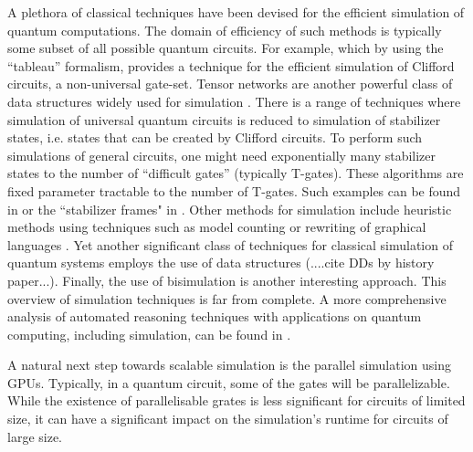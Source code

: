 \documentclass[runningheads]{llncs}
\begin{document}
A plethora of classical techniques have been devised for the efficient simulation of quantum computations. The domain of efficiency of such methods is typically some subset of all possible quantum circuits. For example, \cite{gottesman1997stabilizer} which by using the ``tableau'' formalism, provides a technique for the efficient simulation of Clifford circuits, a non-universal gate-set. Tensor networks are another powerful class of data structures widely used for simulation \cite{TN1,TN2}. There is a range of techniques where simulation of universal quantum circuits is reduced to simulation of stabilizer states, i.e. states that can be created by Clifford circuits. To perform such simulations of general circuits, one might need exponentially many stabilizer states to the number of ``difficult gates'' (typically T-gates). These algorithms are fixed parameter tractable to the number of T-gates. Such examples can be found in \cite{aaronson2008improved} or the ``stabilizer frames" in \cite{Garcia_stab_frames}. Other methods for simulation include heuristic methods using techniques such as model counting \cite{mei2024simulating} or rewriting of graphical languages \cite{Coecke_2011}. Yet another significant class of techniques for classical simulation of quantum systems employs the use of data structures (....cite DDs by history paper...). Finally, the use of bisimulation \cite{burgholzer2024forward} is another interesting approach. This overview of simulation techniques is far from complete. A more comprehensive analysis of automated reasoning techniques with applications on quantum computing, including simulation, can be found in \cite{ the SPIN24 history paper } .

A natural next step towards scalable simulation is the parallel simulation using GPUs. Typically, in a quantum circuit, some of the gates will be parallelizable. While the existence of parallelisable grates is less significant for circuits of limited size, it can have a significant impact on the simulation's runtime for circuits of large size. 
\end{document}
